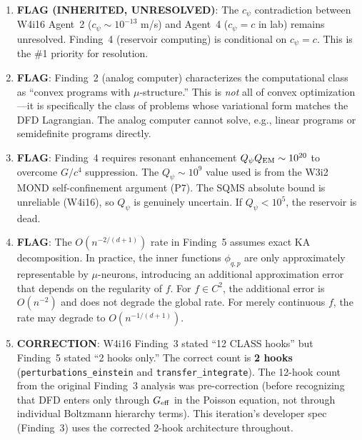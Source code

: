 \documentclass[11pt]{article}
\theoremstyle{definition}
\theoremstyle{remark}
\newcommand{\Geff}{G_{\rm eff}}
\begin{document}
\begin{tcolorbox}[colback=red!5!white, colframe=red!60!black,
  title=\textbf{INCONSISTENCIES AND FLAGS}]
\begin{enumerate}[nosep]
\item \textbf{FLAG (INHERITED, UNRESOLVED)}: The $c_\psi$ contradiction
  between W4i16 Agent~2 ($c_\psi \sim 10^{-13}$ m/s) and Agent~4
  ($c_\psi = c$ in lab) remains unresolved. Finding~4 (reservoir
  computing) is conditional on $c_\psi = c$. This is the \#1
  priority for resolution.

\item \textbf{FLAG}: Finding~2 (analog computer) characterizes the
  computational class as ``convex programs with $\mu$-structure.''
  This is \emph{not} all of convex optimization---it is specifically
  the class of problems whose variational form matches the DFD
  Lagrangian. The analog computer cannot solve, e.g., linear
  programs or semidefinite programs directly.

\item \textbf{FLAG}: Finding~4 requires resonant enhancement
  $Q_\psi Q_{\rm EM} \sim 10^{20}$ to overcome $G/c^4$ suppression.
  The $Q_\psi \sim 10^9$ value used is from the W3i2 MOND
  self-confinement argument (P7). The SQMS absolute bound
  is unreliable (W4i16), so $Q_\psi$ is genuinely uncertain.
  If $Q_\psi < 10^5$, the reservoir is dead.

\item \textbf{FLAG}: The $O(n^{-2/(d+1)})$ rate in Finding~5
  assumes exact KA decomposition. In practice, the inner functions
  $\phi_{q,p}$ are only approximately representable by $\mu$-neurons,
  introducing an additional approximation error that depends on the
  regularity of $f$. For $f \in C^2$, the additional error is
  $O(n^{-2})$ and does not degrade the global rate. For merely
  continuous $f$, the rate may degrade to $O(n^{-1/(d+1)})$.

\item \textbf{CORRECTION}: W4i16 Finding~3 stated ``12 CLASS hooks''
  but Finding~5 stated ``2 hooks only.'' The correct count is
  \textbf{2 hooks} (\texttt{perturbations\_einstein} and
  \texttt{transfer\_integrate}). The 12-hook count from the original
  Finding~3 analysis was pre-correction (before recognizing that DFD
  enters only through $\Geff$ in the Poisson equation, not through
  individual Boltzmann hierarchy terms). This iteration's developer
  spec (Finding~3) uses the corrected 2-hook architecture throughout.
\end{enumerate}
\end{tcolorbox}
\end{document}
